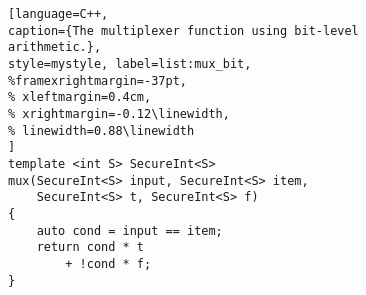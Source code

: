 \begin{figure}[t]
\begin{minipage}{\linewidth}
\begin{lstlisting}[language=C++,
caption={The multiplexer function using bit-level arithmetic.},
style=mystyle, label=list:mux_bit,
%framexrightmargin=-37pt,
% xleftmargin=0.4cm,
% xrightmargin=-0.12\linewidth,
% linewidth=0.88\linewidth
]
template <int S> SecureInt<S>
mux(SecureInt<S> input, SecureInt<S> item,
    SecureInt<S> t, SecureInt<S> f)
{
    auto cond = input == item;
    return cond * t
        + !cond * f;
}
\end{lstlisting}
\end{minipage}
\end{figure}
